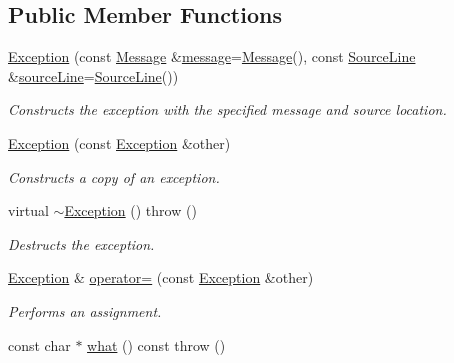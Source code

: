 \subsection*{Public Member Functions}
\begin{DoxyCompactItemize}
\item 
\hyperlink{class_exception_aac5e9386080a8eac2edebf02c8169ecc}{Exception} (const \hyperlink{class_message}{Message} \&\hyperlink{class_exception_aab5c1504a18016fdfe7574eb81f59ac6}{message}=\hyperlink{class_message}{Message}(), const \hyperlink{class_source_line}{Source\+Line} \&\hyperlink{class_exception_a67f40ff3ea7f1c07e46222c38dcbaf43}{source\+Line}=\hyperlink{class_source_line}{Source\+Line}())
\begin{DoxyCompactList}\small\item\em Constructs the exception with the specified message and source location. \end{DoxyCompactList}\item 
\hyperlink{class_exception_ae0fd52e62283ee92c085d767d0aab736}{Exception} (const \hyperlink{class_exception}{Exception} \&other)
\begin{DoxyCompactList}\small\item\em Constructs a copy of an exception. \end{DoxyCompactList}\item 
virtual \hyperlink{class_exception_ad1ba411de295ef2eeb02ba26284a829a}{$\sim$\+Exception} ()  throw ()\hypertarget{class_exception_ad1ba411de295ef2eeb02ba26284a829a}{}\label{class_exception_ad1ba411de295ef2eeb02ba26284a829a}

\begin{DoxyCompactList}\small\item\em Destructs the exception. \end{DoxyCompactList}\item 
\hyperlink{class_exception}{Exception} \& \hyperlink{class_exception_a71c844ee3ac32b7656c24386e9ab60a0}{operator=} (const \hyperlink{class_exception}{Exception} \&other)\hypertarget{class_exception_a71c844ee3ac32b7656c24386e9ab60a0}{}\label{class_exception_a71c844ee3ac32b7656c24386e9ab60a0}

\begin{DoxyCompactList}\small\item\em Performs an assignment. \end{DoxyCompactList}\item 
const char $\ast$ \hyperlink{class_exception_a45642915395d3b813fedc2593fbcb8bb}{what} () const   throw ()\hypertarget{class_exception_a45642915395d3b813fedc2593fbcb8bb}{}\label{class_exception_a45642915395d3b813fedc2593fbcb8bb}


\end{DoxyCompactItemize}
